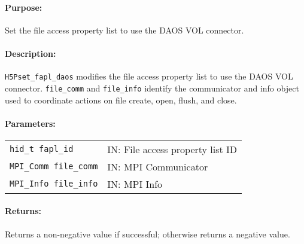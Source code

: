 \paragraph{Purpose:}
\begin{flushleft}%
Set the file access property list to use the DAOS VOL connector.
\end{flushleft}%

\paragraph{Description:}
\begin{flushleft}%
\texttt{H5Pset\_fapl\_daos} modifies the file access property list to use the
DAOS VOL connector. \texttt{file\_comm} and
\texttt{file\_info} identify the communicator and info object used to
coordinate actions on file create, open, flush, and close.
\end{flushleft}%

\paragraph{Parameters:}
\begin{flushleft}%
 \begin{tabular}{ll}%
   \texttt{hid\_t fapl\_id} & IN: File access property list ID \\
   \texttt{MPI\_Comm file\_comm} & IN: MPI Communicator \\
   \texttt{MPI\_Info file\_info} & IN: MPI Info \\
 \end{tabular}%
\end{flushleft}%

\paragraph{Returns:}
\begin{flushleft}%
Returns a non-negative value if successful; otherwise returns a negative value.
\end{flushleft}%


